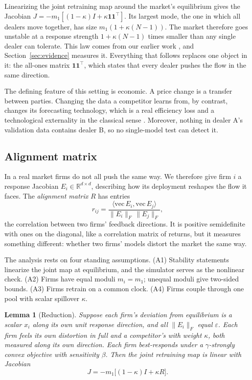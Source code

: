 \documentclass[conference]{IEEEtran}
\theoremstyle{plain}
\newtheorem{lemma}{Lemma}
\newcommand{\one}{\mathbf{1}}
\begin{document}
Linearizing the joint retraining map around the market's equilibrium gives the Jacobian $J=-m_1[(1-\kappa)I+\kappa\one\one^{\top}]$. Its largest mode, the one in which all dealers move together, has size $m_1(1+\kappa(N-1))$. The market therefore goes unstable at a response strength $1+\kappa(N-1)$ times smaller than any single dealer can tolerate. This law comes from our earlier work \cite{reflex2026}, and Section~\ref{sec:evidence} measures it. Everything that follows replaces one object in it: the all-ones matrix $\one\one^{\top}$, which states that every dealer pushes the flow in the same direction.

The defining feature of this setting is economic. A price change is a transfer between parties. Changing the data a competitor learns from, by contrast, changes its forecasting technology, which is a real efficiency loss and a technological externality in the classical sense \cite{buchanan1962}. Moreover, nothing in dealer A's validation data contains dealer B, so no single-model test can detect it.

\subsection{Alignment matrix}
In a real market firms do not all push the same way. We therefore give firm $i$ a response Jacobian $E_i\in\mathbb{R}^{d\times d}$, describing how its deployment reshapes the flow it faces. The \emph{alignment matrix} $R$ has entries
\begin{equation}
r_{ij}=\frac{\langle \mathrm{vec}\,E_i,\mathrm{vec}\,E_j\rangle}{\|E_i\|_F\,\|E_j\|_F},
\end{equation}
the correlation between two firms' feedback directions. It is positive semidefinite with ones on the diagonal, like a correlation matrix of returns, but it measures something different: whether two firms' models distort the market the same way.

The analysis rests on four standing assumptions. (A1) Stability statements linearize the joint map at equilibrium, and the simulator serves as the nonlinear check. (A2) Firms have equal moduli $m_i=m_1$; unequal moduli give two-sided bounds. (A3) Firms retrain on a common clock. (A4) Firms couple through one pool with scalar spillover $\kappa$.

\begin{lemma}[Reduction]
\label{lem:reduction}
Suppose each firm's deviation from equilibrium is a scalar $x_i$ along its own unit response direction, and all $\|E_i\|_F$ equal $\varepsilon$. Each firm feels its own distortion in full and a competitor's with weight $\kappa$, both measured along its own direction. Each firm best-responds under a $\gamma$-strongly convex objective with sensitivity $\beta$. Then the joint retraining map is linear with Jacobian
\begin{equation}
\label{eq:reduction}
J=-m_1\bigl[(1-\kappa)I+\kappa R\bigr].
\end{equation}
\end{lemma}
\end{document}

